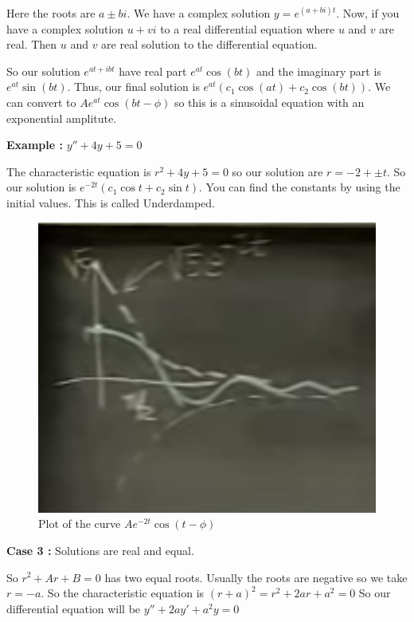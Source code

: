 Here the roots are $a \pm bi$. 
We have a complex solution $y = e^{(a+bi)t}$.
Now, if you have a complex solution $u + vi$ to a real differential equation 
where $u$ and $v$ are real. Then $u$ and $v$ are real solution to the differential equation. 

So our solution $e^{at + ibt}$ have real part $e^{at}\cos(bt)$ and the imaginary part is $e^{at}\sin(bt)$.
Thus, our final solution is $e^{at}(c_1 \cos(at) + c_2 \cos(bt))$.
We can convert to $Ae^{at} \cos(bt - \phi)$ 
so this is a sinusoidal equation with an exponential amplitute.

{\bf Example : } $y'' + 4y + 5 = 0$

The characteristic equation is $r^2 + 4y + 5 = 0$ so our solution are $r = -2 + \pm t$.
So our solution is $e^{-2t}(c_1 \cos t + c_2 \sin t)$.
You can find the constants by using the initial values.
This is called Underdamped.

\begin{figure}[ht!]
    \centering
    \includegraphics[scale=0.25]{./images/lecture_9_figure_2.png}
    \caption{Plot of the curve $Ae^{-2t}\cos(t - \phi)$}
\end{figure}

{\bf Case 3 : } Solutions are real and equal.

So $r^2 + Ar + B = 0$ has two equal roots.
Usually the roots are negative so we take $r = -a$.
So the characteristic equation is $(r+a)^2 = r^2 + 2ar + a^2 = 0$
So our differential equation will be $y'' + 2a y' + a^2 y = 0$

